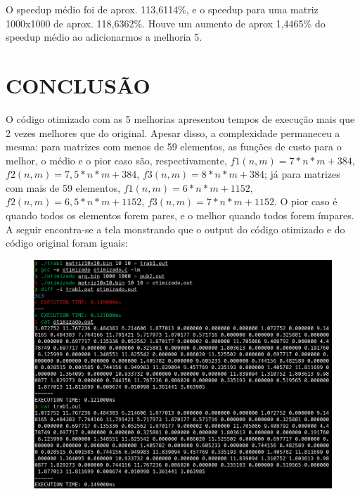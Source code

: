 O speedup médio foi de aprox. 113,6114\%, e o speedup para uma matriz 1000x1000 de aprox. 118,6362\%.  Houve um aumento de aprox 1,4465\% do speedup médio ao adicionarmos a melhoria 5. 


\newpage

\section{\esp CONCLUSÃO}
O código otimizado com as 5 melhorias apresentou tempos de execução mais que 2 vezes melhores que do original. Apesar disso, a complexidade permaneceu a mesma: para matrizes com menos de 59 elementos, as funções de custo para o melhor, o médio e o pior caso são, respectivamente, \(f1(n, m) = 7*n*m + 384\), \(f2(n, m) = 7,5*n*m + 384\), \(f3(n, m) = 8*n*m + 384\); já para matrizes com mais de 59 elementos, \(f1(n, m) = 6*n*m + 1152\), \(f2(n, m) = 6,5*n*m + 1152\), \(f3(n, m) = 7*n*m + 1152\). O pior caso é quando todos os elementos forem pares, e o melhor quando todos forem ímpares.
A seguir encontra-se a tela monstrando que o output do código otimizado e do código original foram iguais:

\begin{figure}[!ht]
	\centering	
	  \vspace{-0.4cm}
	\includegraphics[width=1\textwidth]{figuras/diferenca_output.png}
\end{figure}

